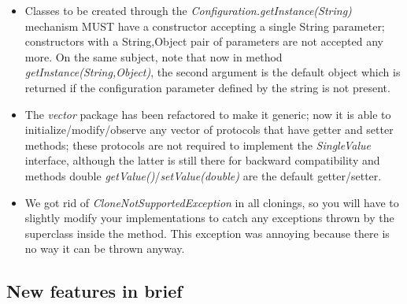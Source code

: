 \documentclass[a4paper,11pt]{article}
\begin{document}
\begin{itemize}
\item Classes to be created through the
  \emph{Configuration.getInstance(String)}  
  mechanism MUST have a constructor accepting a single String
  parameter; constructors 
  with a String,Object pair of parameters are not accepted any more.
  On the same subject, note that now in method
  \emph{getInstance(String,Object)}, 
  the second argument is the default object which is returned if the
  configuration parameter defined by the string is not present.

\item The \emph{vector} package has been refactored to make it
  generic; now it is able 
  to initialize/modify/observe any vector of protocols that have getter and
  setter methods; these protocols are not required to implement the 
  \emph{SingleValue} interface, although the latter is still there for
  backward  
  compatibility and methods double
  \emph{getValue()}/\emph{setValue(double)} are the  
  default getter/setter.

\item We got rid of \emph{CloneNotSupportedException} in all clonings,
  so you will have 
  to slightly modify your implementations to catch any exceptions thrown by 
  the superclass inside the method. This exception was annoying because 
  there is no way it can be thrown anyway.
\end{itemize} 


\subsection{New features in brief}
\label{s:new_features}
\end{document}
